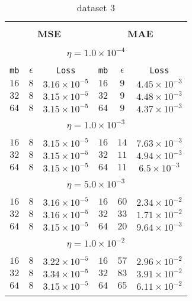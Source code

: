 \begin{table}[]
  \small
  
\begin{center}
\caption{dataset 3}\label{tab:mae1}
\begin{tabular}{@{}ccc|ccc@{}}

\hline\\[-11pt]
\hline\\[-6.5pt]
\multicolumn{3}{c}{\bf MSE} & \multicolumn{3}{c}{\bf MAE } \\[5pt]
\hline\\[-11pt]
\multicolumn{6}{c}{$\eta = 1.0\times 10^{-4}$} \\[5pt]
\hline\\[-11pt]
\texttt{mb} & \texttt{$\epsilon$} & \texttt{Loss} & \texttt{mb} & \texttt{$\epsilon$} & \texttt{Loss} \\[1pt]
$16$ & $8$ & $3.16\times 10^{-5}$  & $16$ & $9$ & $4.45\times 10^{-3}$  \\ [1pt]
$32$ & $8$ & $3.15\times 10^{-5}$  & $32$ & $9$ & $4.48\times 10^{-3}$ \\ [1pt]
$64$ & $8$ & $3.15\times 10^{-5}$  & $64$ & $9$ & $4.37\times 10^{-3}$   \\[1pt]
\hline\\[-11pt]
\multicolumn{6}{c}{$\eta = 1.0\times 10^{-3}$} \\[5pt]
\hline\\[-11pt]
$16$ & $8$ & $3.15\times 10^{-5}$  & $16$ & $14$ & $7.63\times 10^{-3}$  \\ [1pt]
$32$ & $8$ & $3.15\times 10^{-5}$  & $32$ & $11$ & $4.94\times 10^{-3}$  \\ [1pt]
$64$ & $8$ & $3.15\times 10^{-5}$  & $64$ & $11$ & $6.5\times 10^{-3}$   \\ [1pt]
\hline\\[-11pt]
\multicolumn{6}{c}{$\eta = 5.0\times 10^{-3}$} \\[5pt]
\hline\\[-11pt]
$16$ & $8$ & $3.16\times 10^{-5}$  & $16$ & $60$ & $2.34\times 10^{-2}$  \\ [1pt]
$32$ & $8$ & $3.16\times 10^{-5}$  & $32$ & $33$ & $1.71\times 10^{-2}$  \\ [1pt]
$64$ & $8$ & $3.15\times 10^{-5}$  & $64$ & $20$ & $9.64\times 10^{-3}$  \\ [1pt]
\hline\\[-11pt]

\multicolumn{6}{c}{$\eta = 1.0\times 10^{-2}$} \\[5pt]
\hline\\[-11pt]
$16$ & $8$ & $3.22\times 10^{-5}$  & $16$ & $57$ & $2.96\times 10^{-2}$  \\ [1pt]
$32$ & $8$ & $3.34\times 10^{-5}$  & $32$ & $83$ & $3.91\times 10^{-2}$  \\ [1pt]
$64$ & $8$ & $3.15\times 10^{-5}$  & $64$ & $65$ & $6.11\times 10^{-2}$  \\ [1pt]
\hline\\[-11pt]


\end{tabular}
\end{center}
\end{table}
